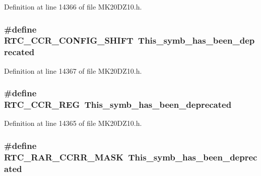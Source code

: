 Definition at line 14366 of file M\+K20\+D\+Z10.\+h.

\subsubsection[{\texorpdfstring{R\+T\+C\+\_\+\+C\+C\+R\+\_\+\+C\+O\+N\+F\+I\+G\+\_\+\+S\+H\+I\+FT}{RTC_CCR_CONFIG_SHIFT}}]{\setlength{\rightskip}{0pt plus 5cm}\#define R\+T\+C\+\_\+\+C\+C\+R\+\_\+\+C\+O\+N\+F\+I\+G\+\_\+\+S\+H\+I\+FT~This\+\_\+symb\+\_\+has\+\_\+been\+\_\+deprecated}\hypertarget{group___backward___compatibility___symbols_gab9af1620804e6b6f3fcd583236fe9196}{}\label{group___backward___compatibility___symbols_gab9af1620804e6b6f3fcd583236fe9196}


Definition at line 14367 of file M\+K20\+D\+Z10.\+h.

\subsubsection[{\texorpdfstring{R\+T\+C\+\_\+\+C\+C\+R\+\_\+\+R\+EG}{RTC_CCR_REG}}]{\setlength{\rightskip}{0pt plus 5cm}\#define R\+T\+C\+\_\+\+C\+C\+R\+\_\+\+R\+EG~This\+\_\+symb\+\_\+has\+\_\+been\+\_\+deprecated}\hypertarget{group___backward___compatibility___symbols_ga568eebd11b2b00084a94f3de4ab02c6a}{}\label{group___backward___compatibility___symbols_ga568eebd11b2b00084a94f3de4ab02c6a}


Definition at line 14365 of file M\+K20\+D\+Z10.\+h.

\subsubsection[{\texorpdfstring{R\+T\+C\+\_\+\+R\+A\+R\+\_\+\+C\+C\+R\+R\+\_\+\+M\+A\+SK}{RTC_RAR_CCRR_MASK}}]{\setlength{\rightskip}{0pt plus 5cm}\#define R\+T\+C\+\_\+\+R\+A\+R\+\_\+\+C\+C\+R\+R\+\_\+\+M\+A\+SK~This\+\_\+symb\+\_\+has\+\_\+been\+\_\+deprecated}\hypertarget{group___backward___compatibility___symbols_ga4041ecda01ac6e2add01865c90abaeca}{}\label{group___backward___compatibility___symbols_ga4041ecda01ac6e2add01865c90abaeca}


